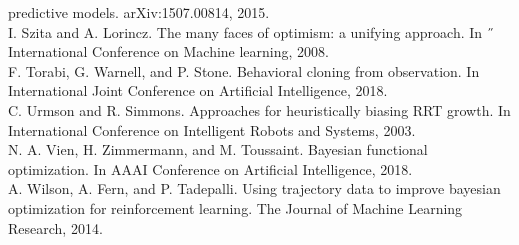 \documentclass{article}
\newcounter{n}
\begin{document}
predictive models. arXiv:1507.00814, 2015.\\
I. Szita and A. Lorincz. The many faces of optimism: a unifying approach. In ˝ International
Conference on Machine learning, 2008.\\
F. Torabi, G. Warnell, and P. Stone. Behavioral cloning from observation. In International Joint
Conference on Artificial Intelligence, 2018.\\
C. Urmson and R. Simmons. Approaches for heuristically biasing RRT growth. In International
Conference on Intelligent Robots and Systems, 2003.\\
N. A. Vien, H. Zimmermann, and M. Toussaint. Bayesian functional optimization. In AAAI
Conference on Artificial Intelligence, 2018.\\
A. Wilson, A. Fern, and P. Tadepalli. Using trajectory data to improve bayesian optimization for
reinforcement learning. The Journal of Machine Learning Research, 2014.
\end{document}
